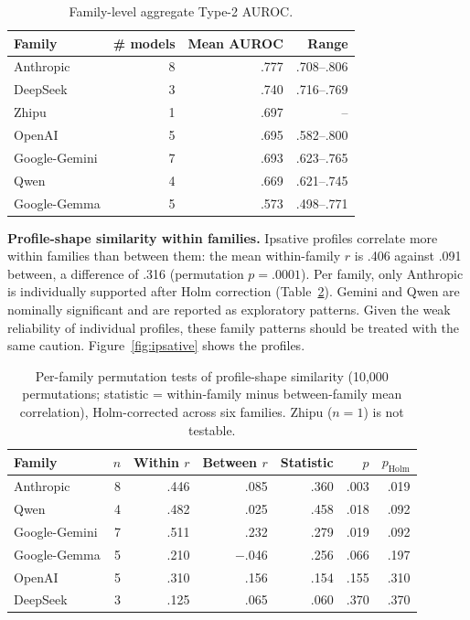 \begin{table}[!htbp]
\centering
\caption{Family-level aggregate Type-2 AUROC.}
\label{tab:families}
\small
\begin{tabular}{lrrr}
\toprule
\textbf{Family} & \textbf{\# models} & \textbf{Mean AUROC} & \textbf{Range} \\
\midrule
Anthropic & 8 & .777 & .708--.806 \\
DeepSeek & 3 & .740 & .716--.769 \\
Zhipu & 1 & .697 & -- \\
OpenAI & 5 & .695 & .582--.800 \\
Google-Gemini & 7 & .693 & .623--.765 \\
Qwen & 4 & .669 & .621--.745 \\
Google-Gemma & 5 & .573 & .498--.771 \\
\bottomrule
\end{tabular}
\end{table}

\textbf{Profile-shape similarity within families.} Ipsative profiles correlate more within families than between them: the mean within-family $r$ is .406 against .091 between, a difference of .316 (permutation $p = .0001$). Per family, only Anthropic is individually supported after Holm correction (Table~\ref{tab:family}). Gemini and Qwen are nominally significant and are reported as exploratory patterns. Given the weak reliability of individual profiles, these family patterns should be treated with the same caution. Figure~\ref{fig:ipsative} shows the profiles.

\begin{table}[!htbp]
\centering
\caption{Per-family permutation tests of profile-shape similarity (10{,}000 permutations; statistic = within-family minus between-family mean correlation), Holm-corrected across six families. Zhipu ($n = 1$) is not testable.}
\label{tab:family}
\small
\begin{tabular}{lrrrrrr}
\toprule
\textbf{Family} & \textbf{$n$} & \textbf{Within $r$} & \textbf{Between $r$} & \textbf{Statistic} & \textbf{$p$} & \textbf{$p_{\text{Holm}}$} \\
\midrule
Anthropic & 8 & .446 & .085 & .360 & .003 & .019 \\
Qwen & 4 & .482 & .025 & .458 & .018 & .092 \\
Google-Gemini & 7 & .511 & .232 & .279 & .019 & .092 \\
Google-Gemma & 5 & .210 & $-$.046 & .256 & .066 & .197 \\
OpenAI & 5 & .310 & .156 & .154 & .155 & .310 \\
DeepSeek & 3 & .125 & .065 & .060 & .370 & .370 \\
\bottomrule
\end{tabular}
\end{table}

